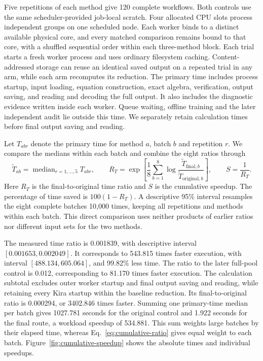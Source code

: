Five repetitions of each method give 120 complete workflows.
Both controls use the same scheduler-provided job-local scratch.
Four allocated CPU slots process independent groups on one scheduled
node. Each worker binds to a distinct available physical core, and
every matched comparison remains bound to that core,
with a shuffled sequential order within each three-method block. Each trial starts a fresh
worker process and uses ordinary filesystem caching. Content-addressed
storage can reuse an identical saved output on a repeated trial in any
arm, while each arm recomputes its reduction. The primary time includes
process startup, input loading, equation construction, exact algebra,
verification, output saving, and reading and decoding the full output.
It also includes the diagnostic evidence written inside each worker.
Queue waiting, offline training and the later independent audit lie
outside this time. We separately retain calculation times before
final output saving and reading.

Let \(T_{abr}\) denote the primary time for method \(a\), batch \(b\)
and repetition \(r\). We compare the medians within each batch and
combine the eight ratios through
\begin{equation}
 \widetilde T_{ab}=\operatorname{median}_{r=1,\ldots,5}T_{abr},
 \qquad
 R_T=\exp\!\left[\frac{1}{8}\sum_{b=1}^{8}
 \log\frac{\widetilde T_{\mathrm{final},b}}
               {\widetilde T_{\mathrm{original},b}}\right],
 \qquad
 S=\frac{1}{R_T}.
 \label{eq:cumulative-ratio}
\end{equation}
Here \(R_T\) is the final-to-original time ratio and \(S\) is the cumulative
speedup. The percentage of time saved is \(100(1-R_T)\).
A descriptive 95\% interval resamples the eight complete batches
10,000 times, keeping all repetitions and methods within each batch.
This direct comparison uses neither products of earlier ratios nor
different input sets for the two methods.

The measured time ratio is 0.001839, with descriptive interval
\([0.001653,0.002049]\). It corresponds to 543.815 times faster execution,
with interval \([488.134,605.064]\), and 99.82\% less time.
The ratio to the later full-pool control is 0.012,
corresponding to 81.170 times faster execution.
The calculation subtotal excludes outer worker startup and final output
saving and reading, while retaining every Kira startup within the
baseline reduction. Its final-to-original ratio is 0.000294,
or 3402.846 times faster.
Summing one primary-time median per batch gives 1027.781 seconds
for the original control and 1.922 seconds for the final route,
a workload speedup of 534.881. This sum weights large batches
by their elapsed time, whereas Eq.~\eqref{eq:cumulative-ratio} gives
equal weight to each batch. Figure~\ref{fig:cumulative-speedup} shows
the absolute times and individual speedups.

